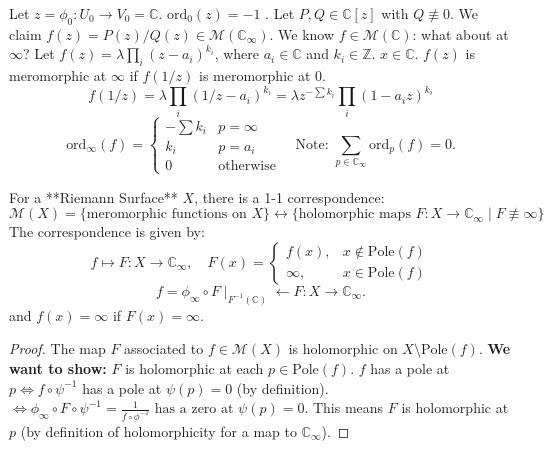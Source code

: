 \documentclass{article}
\begin{document}
\begin{example} 
Let $z=\phi_0: U_0 \to V_0 = \mathbb{C}$. $\text{ord}_0(z) = -1$ .
Let $P, Q \in \mathbb{C}[z]$ with $Q \not\equiv 0$. We claim $f(z) = P(z)/Q(z) \in \mathcal{M}(\mathbb{C}_{\infty})$.
We know $f \in \mathcal{M}(\mathbb{C})$: what about at $\infty$?
Let $f(z) = \lambda \prod_{i} (z-a_i)^{k_i}$, where $a_i \in \mathbb{C}$ and $k_i \in \mathbb{Z}$. $x \in \mathbb{C}$.
$f(z)$ is meromorphic at $\infty$ if $f(1/z)$ is meromorphic at $0$.
$$
f(1/z) =\lambda \prod_{i} (1/z - a_i)^{k_i} = \lambda z^{-\sum k_i} \prod_{i}  (1 - a_i z)^{k_i}
$$
$$
\text{ord}_{\infty}(f) =
\left\{
\begin{array}{ll}
-\sum k_i & p=\infty \\
k_i & p=a_i \\
0 & \text{otherwise}
\end{array}
\right.
\quad \text{Note: } \sum_{p \in \mathbb{C}_{\infty}} \text{ord}_p(f) = 0.
$$
\end{example}

\begin{theorem}  
For a **Riemann Surface** $X$, there is a 1-1 correspondence:
$$
\mathcal{M}(X) = \{ \text{meromorphic functions on } X \} \longleftrightarrow \{ \text{holomorphic maps } F: X \to \mathbb{C}_{\infty} \mid F \not \equiv \infty \}
$$
The correspondence is given by:
$$
f \longmapsto F: X \to \mathbb{C}_{\infty}, \quad F(x) =
\left\{
\begin{array}{ll}
f(x), & x \notin \text{Pole}(f) \\
\infty, & x \in \text{Pole}(f)
\end{array}
\right.
$$
$$
f = \phi_{\infty} \circ F \mid_{F^{-1}(\mathbb{C})} \longleftarrow F: X \to \mathbb{C}_{\infty}.
$$
and $f(x)=\infty$ if $F(x)=\infty$.
\end{theorem}

\begin{proof}
The map $F$ associated to $f \in \mathcal{M}(X)$ is holomorphic on $X \setminus \text{Pole}(f)$.
\textbf{We want to show:} $F$ is holomorphic at each $p \in \text{Pole}(f)$.
$f$ has a pole at $p \iff f \circ \psi^{-1}$ has a pole at $\psi(p)=0$ (by definition).\\
$\iff \phi_{\infty} \circ F \circ \psi^{-1} = \frac{1}{f \circ \phi^{-1}} \text{ has a zero at } \psi(p) = 0.$
This means $F$ is holomorphic at $p$ (by definition of holomorphicity for a map to $\mathbb{C}_{\infty}$).
\end{proof}
\end{document}
